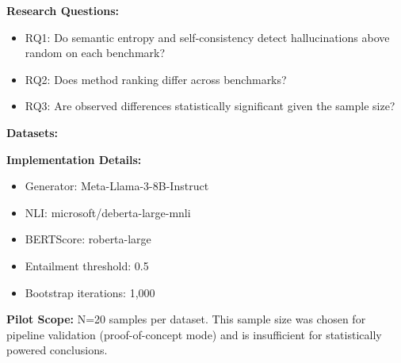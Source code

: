 
\textbf{Research Questions:}
\begin{itemize}
\item RQ1: Do semantic entropy and self-consistency detect hallucinations above random on each benchmark?
\item RQ2: Does method ranking differ across benchmarks?
\item RQ3: Are observed differences statistically significant given the sample size?
\end{itemize}

\textbf{Datasets:}

\begin{table}[htbp]
\centering
{}
\end{table}

\textbf{Implementation Details:}
\begin{itemize}
\item Generator: Meta-Llama-3-8B-Instruct
\item NLI: microsoft/deberta-large-mnli
\item BERTScore: roberta-large
\item Entailment threshold: 0.5
\item Bootstrap iterations: 1,000
\end{itemize}

\textbf{Pilot Scope:} N=20 samples per dataset. This sample size was chosen for pipeline validation (proof-of-concept mode) and is insufficient for statistically powered conclusions.

